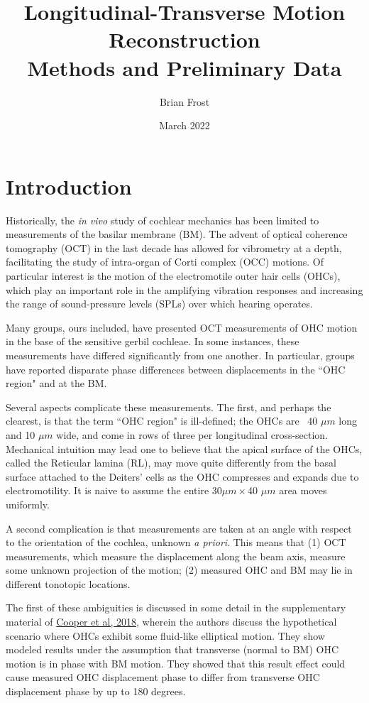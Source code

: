 \documentclass{article}
\title{Longitudinal-Transverse Motion Reconstruction \\ Methods and Preliminary Data}
\author{Brian Frost}
\date{March 2022}
\begin{document}
\maketitle

\section{Introduction}
\par{Historically, the \textit{in vivo} study of cochlear mechanics has been limited to measurements of the basilar membrane (BM). The advent of optical coherence tomography (OCT) in the last decade has allowed for vibrometry at a depth, facilitating the study of intra-organ of Corti complex (OCC) motions. Of particular interest is the motion of the electromotile outer hair cells (OHCs), which play an important role in the amplifying vibration responses and increasing the range of sound-pressure levels (SPLs) over which hearing operates.}
\par{Many groups, ours included, have presented OCT measurements of OHC motion in the base of the sensitive gerbil cochleae. In some instances, these measurements have differed significantly from one another. In particular, groups have reported disparate phase differences between displacements in the ``OHC region" and at the BM.}
\par{Several aspects complicate these measurements. The first, and perhaps the clearest, is that the term ``OHC region" is ill-defined; the OHCs are ~40 $\mu m$ long and 10 $\mu m$ wide, and come in rows of three per longitudinal cross-section. Mechanical intuition may lead one to believe that the apical surface of the OHCs, called the Reticular lamina (RL), may move quite differently from the basal surface attached to the Deiters' cells as the OHC compresses and expands due to electromotility. It is naive to assume the entire 30$\mu m\times$40 $\mu m$ area moves uniformly.}
\par{A second complication is that measurements are taken at an angle with respect to the orientation of the cochlea, unknown \textit{a priori}. This means that (1) OCT measurements, which measure the displacement along the beam axis, measure some unknown projection of the motion; (2) measured OHC and BM may lie in different tonotopic locations.}
\par{The first of these ambiguities is discussed in some detail in the supplementary material of \href{https://www.nature.com/articles/s41467-018-05483-z}{Cooper et al, 2018}, wherein the authors discuss the hypothetical scenario where OHCs exhibit some fluid-like elliptical motion. They show modeled results under the assumption that transverse (normal to BM) OHC motion is in phase with BM motion. They showed that this result effect could cause measured OHC displacement phase to differ from transverse OHC displacement phase by up to 180 degrees.}
\end{document}
